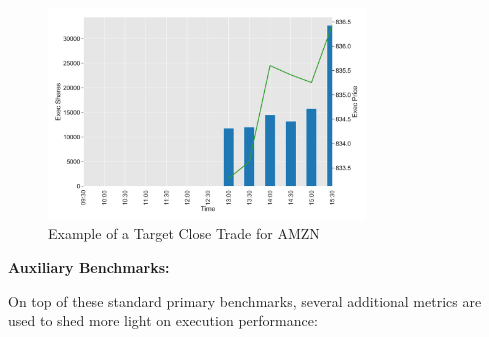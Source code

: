 	\begin{figure}[!ht]
	\centering
	\includegraphics[width=0.75\textwidth]{chapters/chapter_exec_models/figures/close.png} 
	\caption{Example of a Target Close Trade for AMZN \label{fig:close}}
	\end{figure}


\noindent\textbf{Auxiliary Benchmarks:} 

On top of these standard primary benchmarks, several additional metrics are used to shed more light on execution performance:

